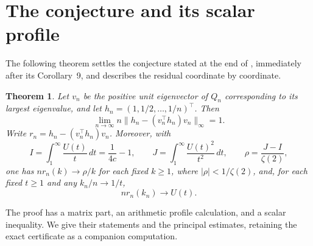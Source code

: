\documentclass[11pt]{article}
\newtheorem{theorem}{Theorem}[section]
\theoremstyle{remark}\newtheorem{remark}[theorem]{Remark}
\begin{document}
\section{The conjecture and its scalar profile}
The following theorem settles the conjecture stated at the end of \cite{kline}, immediately after its Corollary~9, and describes the residual coordinate by coordinate.
\begin{theorem}\label{thm:main}
Let $v_n$ be the positive unit eigenvector of $Q_n$ corresponding to its largest eigenvalue, and let $h_n=(1,1/2,\ldots,1/n)^\top$. Then
\begin{equation}\label{eq:conjecture}
 \lim_{n\to\infty}n\bigl\|h_n-(v_n^\top h_n)v_n\bigr\|_\infty=1.
\end{equation}
Write $r_n=h_n-(v_n^\top h_n)v_n$. Moreover, with
\[
 I=\int_1^\infty\frac{U(t)}t\,dt=\frac1{4c}-1,
 \qquad J=\int_1^\infty\frac{U(t)^2}{t^2}\,dt,
 \qquad \rho=\frac{J-I}{\zeta(2)},
\]
one has $nr_n(k)\to\rho/k$ for each fixed $k\ge1$, where $|\rho|<1/\zeta(2)$, and, for each fixed $t\ge1$ and any $k_n/n\to1/t$,
\[
 nr_n(k_n)\longrightarrow U(t).
\]
\end{theorem}
The proof has a matrix part, an arithmetic profile calculation, and a scalar inequality. We give their statements and the principal estimates, retaining the exact certificate as a companion computation.
\end{document}
